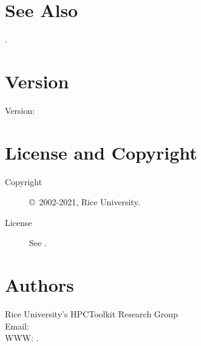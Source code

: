 \documentclass[english]{article}
\begin{document}



\section{See Also}

.

\section{Version}

Version: \Version

\section{License and Copyright}

\begin{description}
\item[Copyright] \copyright\ 2002-2021, Rice University.
\item[License] See .
\end{description}

\section{Authors}

\noindent
Rice University's HPCToolkit Research Group \\
Email:  \\
WWW: .

\LatexManEnd
\end{document}
